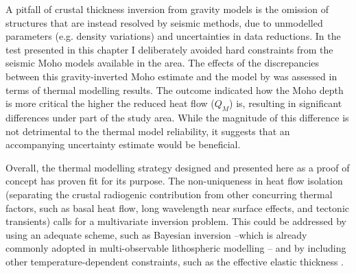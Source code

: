 A pitfall of crustal thickness inversion from gravity models is the omission of structures that are instead resolved by seismic methods, due to unmodelled parameters (e.g. density variations) and uncertainties in data reductions.
In the test presented in this chapter I deliberately avoided hard constraints from the seismic Moho models available in the area.
The effects of the discrepancies between this gravity-inverted Moho estimate and the model by \textcite{Grad2009} was assessed in terms of thermal modelling results.
The outcome indicated how the Moho depth is more critical the higher the reduced heat flow ($Q_M$) is, resulting in significant differences under part of the study area.
While the magnitude of this difference is not detrimental to the thermal model reliability, it suggests that an accompanying uncertainty estimate would be beneficial.

Overall, the thermal modelling strategy designed and presented here as a proof of concept has proven fit for its purpose.
The non-uniqueness in heat flow isolation (separating the crustal radiogenic contribution from other concurring thermal factors, such as basal heat flow, long wavelength near surface effects, and tectonic transients) calls for a multivariate inversion problem.
This could be addressed by using an adequate scheme, such as Bayesian inversion \parencite{Mosegaard1995} --which is already commonly adopted in multi-observable lithospheric modelling \parencite[e.g ][]{Mather2018}-- and by including other temperature-dependent constraints, such as the effective elastic thickness \parencite{Burov1995}.

